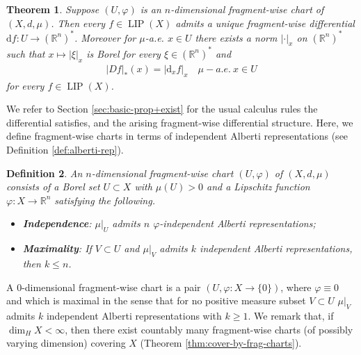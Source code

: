 \documentclass{amsart}
\newtheorem{theorem}{Theorem}[section]
\newtheorem{definition}[theorem]{Definition}
\numberwithin{equation}{section}
\newcommand{\R}{\mathbb{R}}
\newcommand{\LIP}{\operatorname{LIP}}
\newcommand{\ud}{\mathrm {d}}
\begin{document}
\begin{theorem}\label{thm:diff-and-ptwise-norm}
Suppose $(U,\varphi)$ is an $n$-dimensional fragment-wise chart of $(X,d,\mu)$. Then every $f\in \LIP(X)$ admits a unique fragment-wise differential $\ud f:U\to(\R^n)^*$. Moreover for $\mu$-a.e. $x\in U$ there exists a norm $|\cdot|_x$ on $(\R^n)^*$ such that $x\mapsto |\xi|_x$ is Borel for every $\xi\in (\R^n)^*$ and
\begin{align}\label{eq:ptwise-norm}
|Df|_\ast(x)=|\ud_xf|_x\quad\mu-a.e.\ x\in U
\end{align}
for every $f\in \LIP(X)$.
\end{theorem}
We refer to Section \ref{sec:basic-prop+exist} for the usual calculus rules the differential satisfies, and the arising fragment-wise differential structure. Here, we define fragment-wise charts in terms of independent Alberti representations (see Definition \ref{def:alberti-rep}).
\begin{definition}\label{def:frag-chart}
    An $n$-dimensional fragment-wise chart $(U,\varphi)$ of $(X,d,\mu)$ consists of a Borel set $U\subset X$ with $\mu(U)>0$ and a Lipschitz function $\varphi:X\to \R^n$ satisfying the following.
    \begin{itemize}
        \item[(i)] {\bf Independence}: $\mu|_U$ admits $n$ $\varphi$-independent Alberti representations;
        \item[(ii)] {\bf Maximality}: If $V\subset U$ and $\mu|_V$ admits $k$ independent Alberti representations, then $k\le n$.
    \end{itemize}
\end{definition}
A $0$-dimensional fragment-wise chart is a pair $(U,\varphi:X\to \{0\})$, where $\varphi\equiv 0$ and which is maximal in the sense that for no positive measure subset $V\subset U$ $\mu|_V$ admits $k$ independent Alberti representations with $k\geq 1$. We remark that, if $\dim_HX<\infty$, then there exist countably many fragment-wise charts (of possibly varying dimension) covering $X$ (Theorem \ref{thm:cover-by-frag-charts}).
\end{document}
